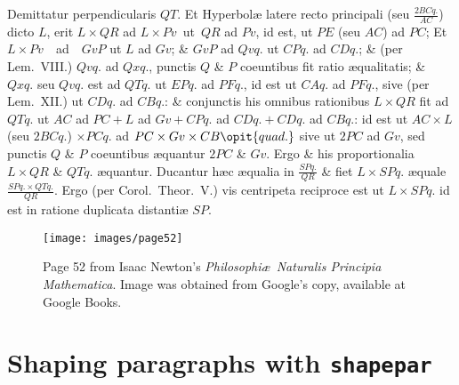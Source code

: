 \bottomline
{}  \zz \the\dimexpr\textwidth-120pt
                   \zz \the\dimexpr\textwidth-120pt
                   \zz \the\dimexpr\textwidth-120pt
                   \zz \inn %
                   \zz \inn
                   \zz \inn
    \zz  \inn
   \zz  \innn
  \zz  \innn
   \zz \innn
   \zz \innn
                 \zz \innn
                 \zz \innnn
                  \zz \innnn
   \zz \innnn
                 \zz \innnn
                  \zz \innnn
   \zz \innnn
   \zz \innnn
                 \zz \innnn
                 \zz \innnn
                  \zz \innnn
                  \zz \the\dimexpr\textwidth-120pt
  Demittatur perpendicularis $QT$. Et Hyperbol{\ae} latere recto
principali (seu $\frac{2BCq.}{AC}$) dicto $L$, erit $L \times QR$ ad $L \times Pv$~ut~$QR$
ad $Pv$, id est, ut $PE$ (seu $AC$) ad $PC$; Et $L \times Pv$~~ad~~$GvP$
ut $L$ ad $Gv$; \& $GvP$ ad $Qvq.$ ut $CPq.$
ad $CDq.$; \& (per Lem.\ VIII.) $Qvq.$ ad
$Qxq.$, punctis $Q$ \& $P$ coeuntibus
fit ratio {\ae}qualitatis; \& $Qxq.$ seu
$Qvq.$ est ad $QTq.$ ut $EPq.$ ad $PFq.$,
id est ut $CAq.$ ad $PFq.$, sive (per
Lem.\ XII.) ut $CDq.$ ad
$CBq.$: \& conjunctis his omnibus
rationibus $L \times QR$ fit
ad $QTq.$ ut $AC$
ad $PC + L$ ad
$Gv + CPq.$ ad
$CDq. + CDq.$
ad $CBq.$: id est
ut $AC \times L$ (seu
$2BCq.$) $\times PCq.$
ad $PC \times
Gv \times CB \opit{quad.}$
sive ut $2PC$
ad $Gv$, sed
punctis $Q$ \& $P$
coeuntibus
{\ae}quantur $2PC$
\& $Gv$. Ergo \& his proportionalia $L \times QR$ \& $QTq.$ {\ae}quantur.
Ducantur h{\ae}c {\ae}qualia in $\frac{SPq.}{QR}$ \& fiet $L \times SPq.$ {\ae}quale $\frac{SPq. \times QTq.}{QR}$.
Ergo (per Corol.\ Theor.\ V.) vis centripeta reciproce est ut
$L \times SPq.$ id est in ratione duplicata distanti{\ae} $SP$. \QEIit\par
\nobreak
\bottomline
{}
\egroup

\begin{figure}[p]
\centering
\texttt{[image: images/page52]}
\caption{Page 52 from Isaac Newton's \textit{Philosophi\ae\  Naturalis Principia Mathematica}. Image was obtained from Google's copy, available at Google Books.}
\label{fig:principia}
\end{figure}


\section{Shaping paragraphs with \texttt{shapepar}}

